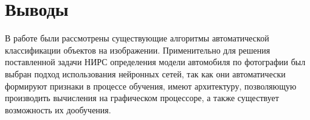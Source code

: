 \documentclass[a4paper,14pt]{extarticle} %
\begin{document}
\section{Выводы}
\hspace{\parindent} В работе были рассмотрены существующие алгоритмы автоматической классификации объектов на изображении. Применительно для решения поставленной задачи НИРС определения модели автомобиля по фотографии был выбран подход использования нейронных сетей, так как они автоматически формируют признаки в процессе обучения, имеют архитектуру, позволяющую производить вычисления на графическом процессоре, а также существует возможность их дообучения.

%
\newpage
\begin{flushleft}
\end{flushleft}
\end{document}
